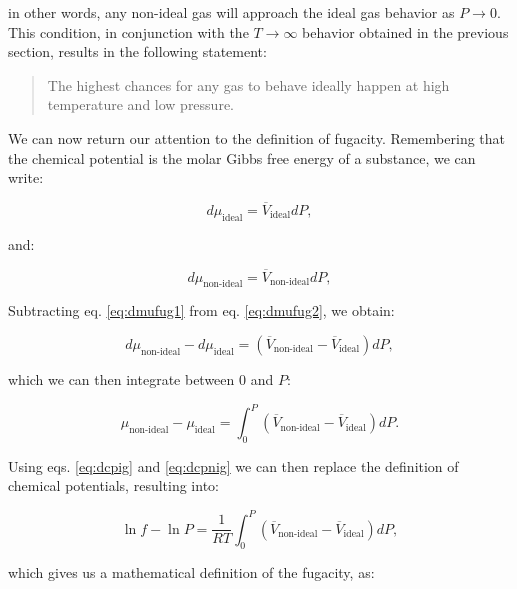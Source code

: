 \documentclass[
  9pt,
]{extbook}
\theoremstyle{definition}
\theoremstyle{definition}
\theoremstyle{definition}
\theoremstyle{definition}
\theoremstyle{remark}
\begin{document}
in other words, any non-ideal gas will approach the ideal gas behavior as \(P\rightarrow 0\). This condition, in conjunction with the \(T\rightarrow \infty\) behavior obtained in the previous section, results in the following statement:

\begin{quote}
The highest chances for any gas to behave ideally happen at high temperature and low pressure.
\end{quote}

We can now return our attention to the definition of fugacity. Remembering that the chemical potential is the molar Gibbs free energy of a substance, we can write:

\begin{equation}
d \mu_{\text{ideal}} = \overline{V}_{\text{ideal}}dP,
\label{eq:dmufug1}
\end{equation}

and:

\begin{equation}
d \mu_{\text{non-ideal}} = \overline{V}_{\text{non-ideal}}dP,
\label{eq:dmufug2}
\end{equation}

Subtracting eq. \eqref{eq:dmufug1} from eq. \eqref{eq:dmufug2}, we obtain:

\begin{equation}
d \mu_{\text{non-ideal}}-d \mu_{\text{ideal}} = \left(\overline{V}_{\text{non-ideal}}-\overline{V}_{\text{ideal}} \right) dP,
\label{eq:dmufug3}
\end{equation}

which we can then integrate between \(0\) and \(P\):

\begin{equation}
\mu_{\text{non-ideal}}-\mu_{\text{ideal}} = \int_0^P \left(\overline{V}_{\text{non-ideal}}-\overline{V}_{\text{ideal}} \right) dP.
\label{eq:dmufug4}
\end{equation}

Using eqs. \eqref{eq:dcpig} and \eqref{eq:dcpnig} we can then replace the definition of chemical potentials, resulting into:

\begin{equation}
\ln f - \ln P = \frac{1}{RT} \int_0^P \left(\overline{V}_{\text{non-ideal}} - \overline{V}_{\text{ideal}} \right) dP,
\label{eq:dmufug5}
\end{equation}

which gives us a mathematical definition of the fugacity, as:
\end{document}

